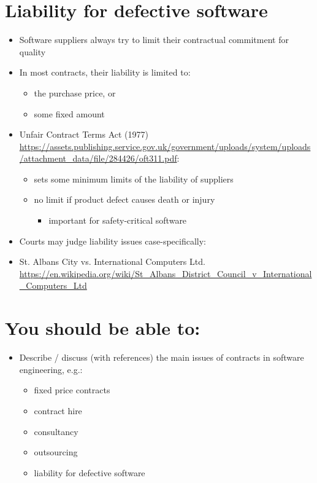 \documentclass{article}
\begin{document}
\section{Liability for defective software}
\begin{itemize}
\item Software suppliers always try to limit their contractual commitment for quality
\item In most contracts, their liability is limited to:
\begin{itemize}
\item the purchase price, or
\item some fixed amount
\end{itemize}
\item Unfair Contract Terms Act (1977) \url{https://assets.publishing.service.gov.uk/government/uploads/system/uploads/attachment_data/file/284426/oft311.pdf}:
\begin{itemize}
\item sets some minimum limits of the liability of suppliers
\item no limit if product defect causes death or injury
\begin{itemize}
\item important for safety-critical software
\end{itemize}
\end{itemize}
\item Courts may judge liability issues case-specifically:
\item St. Albans City vs. International Computers Ltd. \url{https://en.wikipedia.org/wiki/St_Albans_District_Council_v_International_Computers_Ltd}
\end{itemize}



\section{You should be able to:}
\begin{itemize}
\item Describe / discuss (with references) the main issues of contracts in software engineering, e.g.:
\begin{itemize}
\item fixed price contracts
\item contract hire
\item consultancy
\item outsourcing
\item liability for defective software
\end{itemize}
\end{itemize}
\end{document}
